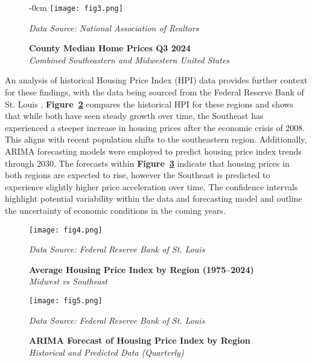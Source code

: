 \documentclass[journal,article,submit,pdftex,moreauthors]{Definitions/mdpi}
\begin{document}
\begin{figure}[H]
  \begin{adjustwidth}{-\extralength}{0cm}
    \centering
    \texttt{[image: fig3.png]}
    \caption{\textbf{County Median Home Prices Q3 2024}\\\textit{Combined Southeastern and Midwestern United States}}
    \label{fig:figure3}
    \vspace{1ex}
    {\footnotesize\textit{Data Source: National Association of Realtors}}
  \end{adjustwidth}
\end{figure}

\vspace{5cm}

An analysis of historical Housing Price Index (HPI) data provides further context for these findings, with the data being sourced from the Federal Reserve Bank of St. Louis \citep{a2024_hpi}. \textbf{Figure~\ref{fig:figure4}} compares the historical HPI for these regions and shows that while both have seen steady growth over time, the Southeast has experienced a steeper increase in housing prices after the economic crisis of 2008. This aligns with recent population shifts to the southeastern region. Additionally, ARIMA forecasting models were employed to predict housing price index trends through 2030. The forecasts within \textbf{Figure~\ref{fig:figure5}} indicate that housing prices in both regions are expected to rise, however the Southeast is predicted to experience slightly higher price acceleration over time. The confidence intervals highlight potential variability within the data and forecasting model and outline the uncertainty of economic conditions in the coming years.

\begin{figure}[H]
  \centering
  \texttt{[image: fig4.png]}
  \caption{\textbf{Average Housing Price Index by Region (1975–2024)}\\\textit{Midwest vs Southeast}}
  \label{fig:figure4}
  \vspace{1ex}
  {\footnotesize\textit{Data Source: Federal Reserve Bank of St. Louis}}
\end{figure}

\begin{figure}[H]
  \centering
  \texttt{[image: fig5.png]}
  \caption{\textbf{ARIMA Forecast of Housing Price Index by Region}\\\textit{Historical and Predicted Data (Quarterly)}}
  \label{fig:figure5}
  \vspace{1ex}
  {\footnotesize\textit{Data Source: Federal Reserve Bank of St. Louis}}
\end{figure}
\end{document}
